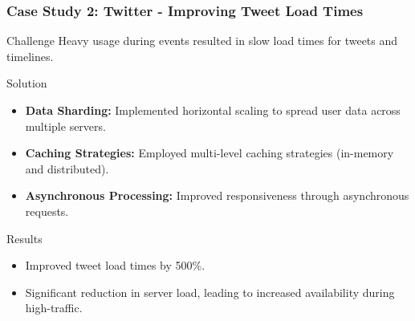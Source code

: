 \documentclass{beamer}
\begin{document}
\begin{frame}[fragile]
    \frametitle{Case Study 2: Twitter - Improving Tweet Load Times}
    \begin{block}{Challenge}
        Heavy usage during events resulted in slow load times for tweets and timelines.
    \end{block}

    \begin{block}{Solution}
        \begin{itemize}
            \item \textbf{Data Sharding:} Implemented horizontal scaling to spread user data across multiple servers.
            \item \textbf{Caching Strategies:} Employed multi-level caching strategies (in-memory and distributed).
            \item \textbf{Asynchronous Processing:} Improved responsiveness through asynchronous requests.
        \end{itemize}
    \end{block}

    \begin{block}{Results}
        \begin{itemize}
            \item Improved tweet load times by 500\%.
            \item Significant reduction in server load, leading to increased availability during high-traffic.
        \end{itemize}
    \end{block}
\end{frame}
\end{document}
